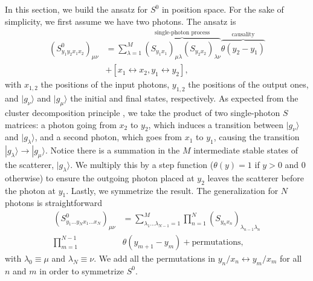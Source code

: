 \documentclass[aps,pra,reprint,amsmath,amssymb]{revtex4-1}
\begin{document}
In this section, we build the ansatz for $S^0$ in position space. For the sake of simplicity, we first assume we have two photons. The ansatz is
\begin{align}\label{eq:S0_2}
(S^0_{y_1y_2x_1x_2})_{\mu\nu}& = \sum_{\lambda=1}^M \overbrace{(S_{y_1x_1})_{\mu\lambda}(S_{y_2x_2})_{\lambda\nu}}^{\text{single-photon process}}\overbrace{\theta(y_2-y_1)}^\text{causality} \nonumber\\
&+ [x_1\leftrightarrow x_2,y_1\leftrightarrow y_2],
\end{align}
with $x_{1,2}$ the positions of the input photons, $y_{1,2}$ the positions of the output ones, and $|g_\nu\rangle$ and $|g_\mu\rangle$ the initial and final states, respectively. As expected from the cluster decomposition principle \cite{weinberg1995}, we take the product of two single-photon $S$ matrices: a photon going from $x_2$ to $y_2$, which induces a transition between $|g_\nu\rangle$ and $|g_\lambda\rangle$, and a second photon, which goes from $x_1$ to $y_1$, causing the transition $|g_\lambda\rangle\to |g_\mu\rangle$. Notice there is a summation in the $M$ intermediate stable states of the scatterer, $|g_\lambda\rangle$. We multiply this by a step function ($\theta(y)=1$ if $y>0$ and $0$ otherwise) to ensure the outgoing photon placed at $y_2$ leaves the scatterer before the photon at $y_1$. Lastly, we symmetrize the result. The generalization for $N$ photons is straightforward
\begin{align}\label{eq:S0_N}
(S^0_{y_1\dots y_N x_1\dots x_N})_{\mu\nu}& = \sum_{\lambda_1\dots \lambda_{N-1}=1}^M\prod_{n=1}^N (S_{y_nx_n})_{\lambda_{n-1}\lambda_n}\nonumber\\
\prod_{m=1}^{N-1}&\theta(y_{m+1}-y_m) + \text{permutations},
\end{align}
with $\lambda_0\equiv \mu$ and $\lambda_N\equiv\nu$. We add all the permutations in $y_n/x_n\leftrightarrow y_m/x_m$ for all $n$ and $m$ in order to symmetrize $S^0$.
\end{document}
